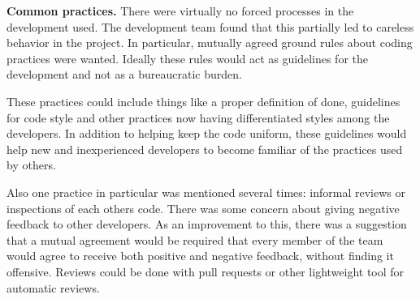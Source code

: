 

\textbf{Common practices.} There were virtually no forced processes in the development used. The development team found that this partially led to careless behavior in the project. In particular, mutually agreed ground rules about coding practices were wanted. Ideally these rules would act as guidelines for the development and not as a bureaucratic burden.

These practices could include things like a proper definition of done, guidelines for code style and other practices now having differentiated styles among the developers. In addition to helping keep the code uniform, these guidelines would help new and inexperienced developers to become familiar of the practices used by others.

Also one practice in particular was mentioned several times: informal reviews or inspections of each others code. There was some concern about giving negative feedback to other developers. As an improvement to this, there was a suggestion that a mutual agreement would be required that every member of the team would agree to receive both positive and negative feedback, without finding it offensive. Reviews could be done with pull requests or other lightweight tool for automatic reviews.





